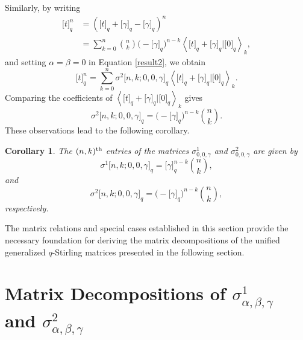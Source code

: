 \documentclass[12pt]{article}
\newtheorem{cor}[thm]{Corollary}
\begin{document}
Similarly, by writing
\begin{align*}
	\big[t\big]_q^n
	&=
	\left(
	\big[t\big]_q+\big[\gamma\big]_q-\big[\gamma\big]_q
	\right)^n\\
	&=
	\sum_{k=0}^{n}
	\binom{n}{k}
	\big(-\big[\gamma\big]_q\big)^{n-k}
	\left\langle
	\big[t\big]_q+\big[\gamma\big]_q
	\big|
	\big[0\big]_q
	\right\rangle_k,
\end{align*}
and setting $\alpha=\beta=0$ in Equation \eqref{result2}, we obtain
\begin{equation*}
	\big[t\big]_q^n
	=
	\sum_{k=0}^{n}
	\sigma^2\big[n,k;0,0,\gamma\big]_q
	\left\langle
	\big[t\big]_q+\big[\gamma\big]_q
	\big|
	\big[0\big]_q
	\right\rangle_k.
\end{equation*}
Comparing the coefficients of
$\left\langle
\big[t\big]_q+\big[\gamma\big]_q
\big|
\big[0\big]_q
\right\rangle_k$
gives
\begin{equation*}
	\sigma^2\big[n,k;0,0,\gamma\big]_q
	=
	\big(-\big[\gamma\big]_q\big)^{n-k}
	\binom{n}{k}.
\end{equation*}
These observations lead to the following corollary.

\begin{cor}\label{thm5}
	The $(n,k)^{\rm th}$ entries of the matrices
	$\sigma^1_{0,0,\gamma}$ and $\sigma^2_{0,0,\gamma}$
	are given by
	\begin{equation}
		\sigma^1\big[n,k;0,0,\gamma\big]_q
		=
		\big[\gamma\big]_q^{n-k}
		\binom{n}{k},
		\label{result9}
	\end{equation}
	and
	\begin{equation}
		\sigma^2\big[n,k;0,0,\gamma\big]_q
		=
		\big(-\big[\gamma\big]_q\big)^{n-k}
		\binom{n}{k},
		\label{result10}
	\end{equation}
	respectively.
\end{cor}

The matrix relations and special cases established in this section provide the necessary foundation for deriving the matrix decompositions of the unified generalized $q$-Stirling matrices presented in the following section.

\section{Matrix Decompositions of $\sigma^1_{\alpha,\beta,\gamma}$ and $\sigma^2_{\alpha,\beta,\gamma}$}
\end{document}
